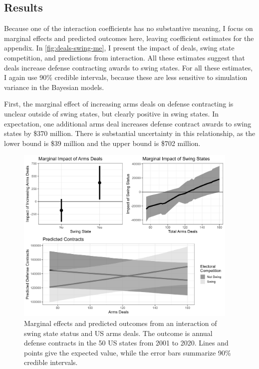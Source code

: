 \documentclass[12pt]{article}
\begin{document}
\subsection{Results}


Because one of the interaction coefficients has no substantive meaning, I focus on marginal effects and predicted outcomes here, leaving coefficient estimates for the appendix.
In \autoref{fig:deals-swing-me}, I present the impact of deals, swing state competition, and predictions from interaction.
All these estimates suggest that deals increase defense contracting awards to swing states. 
For all these estimates, I again use 90\% credible intervals, because these are less sensitive to simulation variance in the Bayesian models. 


First, the marginal effect of increasing arms deals on defense contracting is unclear outside of swing states, but clearly positive in swing states. 
In expectation, one additional arms deal increases defense contract awards to swing states by \$370 million. 
There is substantial uncertainty in this relationship, as the lower bound is \$39 million and the upper bound is \$702 million. 


\begin{figure}[htpb]
	\centering
		\includegraphics[width=0.95\textwidth]{../figures/deals-swing-me.png}
	\caption{Marginal effects and predicted outcomes from an interaction of swing state status and US arms deals. The outcome is annual defense contracts in the 50 US states from 2001 to 2020. Lines and points give the expected value, while the error bars summarize 90\% credible intervals.}
	\label{fig:deals-swing-me}
\end{figure}
\end{document}
